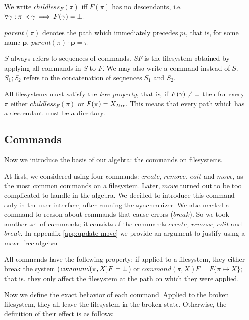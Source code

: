 We write \(childless_F(\pi)\) iff \(F(\pi)\) has no descendants,
i.e. \(\forall\gamma: \pi\prec\gamma\implies F(\gamma)=\bot\).

\(parent(\pi)\) denotes the path which immediately precedes \(pi\), that
is, for some name \(\mathbf{p}\), \(parent(\pi)\cdot \mathbf{p}=\pi\).

\(S\) always refers to sequences of commands. \(SF\) is the filesystem
obtained by applying all commands in \(S\) to \(F\). We may also write a
command instead of \(S\). \(S_1;S_2\) refers to the concatenation of
sequences \(S_1\) and \(S_2\).

All filesystems must satisfy
the \emph{tree property}, that
is, if \(F(\gamma)\neq\bot\) then for every \(\pi\) either
\(childless_F(\pi)\) or \(F(\pi)=X_{Dir}\).
This means that every path which has a descendant must
be a directory.

\subsection{Commands}

Now we introduce the basis of our algebra: the commands on filesystems.

At first, we
considered using four commands: \(create\), \(remove\), \(edit\) and
\(move\), as the most common commands on a filesystem. Later, \(move\)
turned out to be too complicated to handle in the algebra. We decided to introduce
this command only in the user interface, after running the synchronizer.
We also needed a command to reason about commands that cause errors
(\(break\)). So we took another set of commands; it consists of the
commands \(create\), \(remove\), \(edit\) and \(break\). In appendix
\ref{app:update-move} we provide an argument to justify using a
move--free
algebra.

\begin{notrsi}
All commands have the following property: if applied to a filesystem,
they either break the system (\(command(\pi,X)F=\bot\)) or 
\(command(\pi,X)F=F\{\pi\mapsto X\}\); that is, they only affect the filesystem at the path on which
they were applied. 
\end{notrsi}

Now we define the exact behavior of each command.
Applied to the broken filesystem, they all leave
the filesystem in the broken state. Otherwise, 
the definition of their effect is as follows: 


